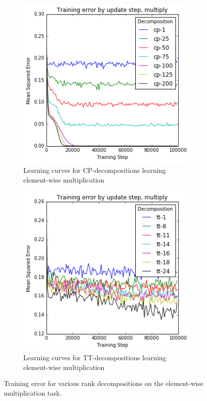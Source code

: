 \begin{figure}
	\begin{subfigure}[t]{0.45\textwidth}
		\includegraphics[width=\textwidth]{tensors/multiply-cp-mom}
		\caption{Learning curves for CP-decompositions learning element-wise multiplication}
	\end{subfigure}
	\hfill
	\begin{subfigure}[t]{0.45\textwidth}
		\includegraphics[width=\textwidth]{tensors/multiply-tt-mom}
		\caption{Learning curves for TT-decompositions learning element-wise multiplication}
	\end{subfigure}
	\caption{Training error for various rank decompositions on the element-wise multiplication
	task.}
	\label{fig:multiply-ff}
\end{figure}


